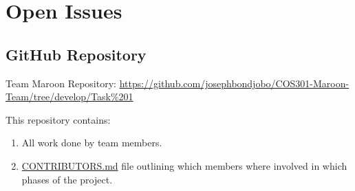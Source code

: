 \documentclass[a4paper,10pt]{article}
\begin{document}
\clearpage
\section{Open Issues}
\subsection {GitHub Repository}
Team Maroon Repository: \url{https://github.com/josephbondjobo/COS301-Maroon-Team/tree/develop/Task%201}

This repository contains:
\begin{enumerate}
\item All work done by team members.
\item \href{https://github.com/josephbondjobo/COS301-Maroon-Team/blob/develop/Intro/Contributors.md}{CONTRIBUTORS.md} file outlining which members where involved in which phases of the project.
\end{enumerate}



\newpage
\clearpage
{}
\end{document}
